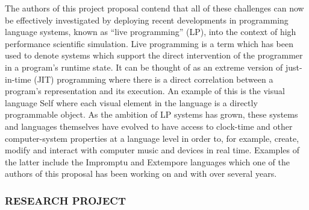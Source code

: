 \documentclass[a4paper,fontsize=12pt]{scrartcl}
\begin{document}
The authors of this project proposal contend that all of these
challenges can now be effectively investigated by deploying recent
developments in programming language systems, known as ``live
programming'' (LP), into the context of high performance scientific
simulation. Live programming is a term which has been used to denote
systems which support the direct intervention of the programmer in a
program's runtime state. It can be thought of as an extreme version of
just-in-time (JIT) programming where there is a direct correlation
between a program's representation and its execution. An example of
this is the visual language Self\parencite{Ungar1987} where each visual
element in the language is a directly programmable object. As the
ambition of LP systems has grown, these systems and languages
themselves have evolved to have access to clock-time and other
computer-system properties at a language level in order to, for
example, create, modify and interact with computer music and devices
in real time. Examples of the latter include the
Impromptu\parencite{Sorensen2005} and Extempore\parencite{Sorensen} languages
which one of the authors of this proposal has been working on and with
over several years.


\subsubsection*{RESEARCH PROJECT}






\end{document}
